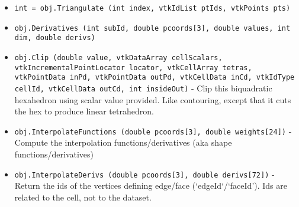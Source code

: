 \begin{itemize}
\item  \verb|int = obj.Triangulate (int index, vtkIdList ptIds, vtkPoints pts)|

\item  \verb|obj.Derivatives (int subId, double pcoords[3], double values, int dim, double derivs)|

\item  \verb|obj.Clip (double value, vtkDataArray cellScalars, vtkIncrementalPointLocator locator, vtkCellArray tetras, vtkPointData inPd, vtkPointData outPd, vtkCellData inCd, vtkIdType cellId, vtkCellData outCd, int insideOut)| -  Clip this biquadratic hexahedron using scalar value provided. Like
 contouring, except that it cuts the hex to produce linear
 tetrahedron.

\item  \verb|obj.InterpolateFunctions (double pcoords[3], double weights[24])| -  Compute the interpolation functions/derivatives
 (aka shape functions/derivatives)

\item  \verb|obj.InterpolateDerivs (double pcoords[3], double derivs[72])| -  Return the ids of the vertices defining edge/face (`edgeId`/`faceId').
 Ids are related to the cell, not to the dataset.

\end{itemize}
